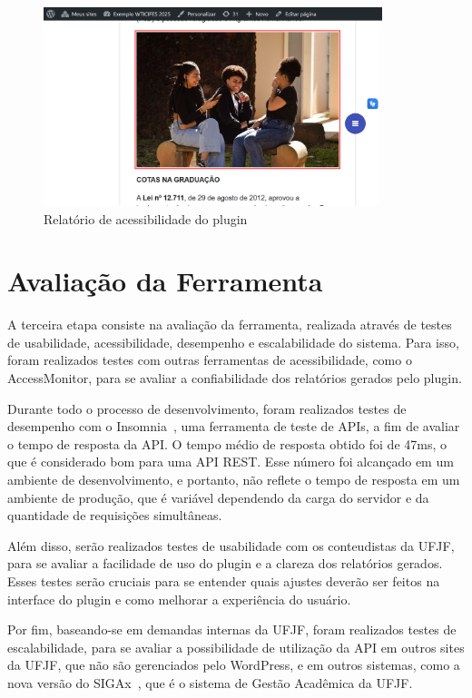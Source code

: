 \documentclass[
    12pt,
    a4paper,
    oneside,
    brazil,
    english
]{article}
\begin{document}
\begin{figure}[ht]
  \centering
  \caption{Relatório de acessibilidade do plugin}
  \label{fig:relatorio3}
  \includegraphics[width=0.88\textwidth]{imagem4.png}
\end{figure}


\section*{Avaliação da Ferramenta}
A terceira etapa consiste na avaliação da ferramenta, realizada
através de testes de usabilidade, acessibilidade, desempenho e escalabilidade
do sistema. Para isso, foram realizados testes com outras ferramentas de
acessibilidade, como o AccessMonitor, para se avaliar a
confiabilidade dos relatórios gerados pelo plugin.

Durante todo o processo
de desenvolvimento, foram realizados testes de desempenho com o Insomnia~\cite{insomnia},
uma ferramenta de teste de APIs, a fim de avaliar o tempo de resposta da API.
O tempo médio de resposta obtido foi de 47ms, o que é considerado
bom para uma API REST. Esse número foi alcançado em um ambiente
de desenvolvimento, e portanto, não reflete o tempo de resposta em um
ambiente de produção, que é variável dependendo da
carga do servidor e da quantidade de requisições simultâneas.

Além disso, serão realizados testes de usabilidade com os conteudistas da
UFJF, para se avaliar a facilidade de uso do plugin e a clareza dos relatórios
gerados. Esses testes serão cruciais para se entender quais ajustes deverão
ser feitos na interface do plugin e como melhorar a experiência do usuário.

Por fim, baseando-se em demandas internas da UFJF, foram realizados testes
de escalabilidade, para se avaliar a possibilidade de utilização da API
em outros sites da UFJF, que não são gerenciados pelo WordPress, e em outros sistemas,
como a nova versão do SIGAx~\cite{SIGAx}, que é o sistema de Gestão Acadêmica da UFJF\@.
\end{document}
